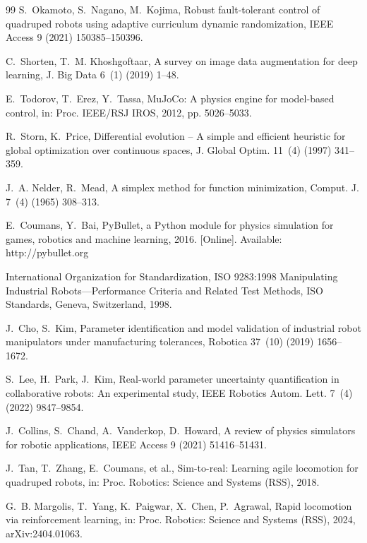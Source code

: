 \documentclass[a4paper]{cas-sc}
\begin{document}
\begin{thebibliography}{99}
S.~Okamoto, S.~Nagano, M.~Kojima, Robust fault-tolerant control of quadruped robots using adaptive curriculum dynamic randomization, IEEE Access 9 (2021) 150385--150396.

C.~Shorten, T.~M. Khoshgoftaar, A survey on image data augmentation for deep learning, J. Big Data 6~(1) (2019) 1--48.

E.~Todorov, T.~Erez, Y.~Tassa, MuJoCo: A physics engine for model-based control, in: Proc. IEEE/RSJ IROS, 2012, pp. 5026--5033.

R.~Storn, K.~Price, Differential evolution -- A simple and efficient heuristic for global optimization over continuous spaces, J. Global Optim. 11~(4) (1997) 341--359.

J.~A. Nelder, R.~Mead, A simplex method for function minimization, Comput. J. 7~(4) (1965) 308--313.

E.~Coumans, Y.~Bai, PyBullet, a Python module for physics simulation for games, robotics and machine learning, 2016. [Online]. Available: http://pybullet.org

International Organization for Standardization, ISO 9283:1998 Manipulating Industrial Robots—Performance Criteria and Related Test Methods, ISO Standards, Geneva, Switzerland, 1998.

J.~Cho, S.~Kim, Parameter identification and model validation of industrial robot manipulators under manufacturing tolerances, Robotica 37~(10) (2019) 1656--1672.

S.~Lee, H.~Park, J.~Kim, Real-world parameter uncertainty quantification in collaborative robots: An experimental study, IEEE Robotics Autom. Lett. 7~(4) (2022) 9847--9854.

J.~Collins, S.~Chand, A.~Vanderkop, D.~Howard, A review of physics simulators for robotic applications, IEEE Access 9 (2021) 51416--51431.

J.~Tan, T.~Zhang, E.~Coumans, et al., Sim-to-real: Learning agile locomotion for quadruped robots, in: Proc. Robotics: Science and Systems (RSS), 2018.

G.~B. Margolis, T.~Yang, K.~Paigwar, X.~Chen, P.~Agrawal, Rapid locomotion via reinforcement learning, in: Proc. Robotics: Science and Systems (RSS), 2024, arXiv:2404.01063.


\end{thebibliography}
\end{document}
